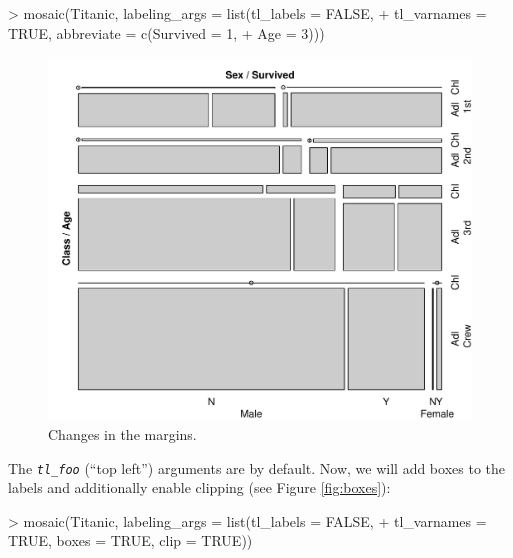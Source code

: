 \documentclass[a4paper]{article}
\newcommand{\var}[1]{\textit{\texttt{#1}}}
\begin{document}
\begin{Schunk}
\begin{Sinput}
> mosaic(Titanic, labeling_args = list(tl_labels = FALSE, 
+     tl_varnames = TRUE, abbreviate = c(Survived = 1, 
+         Age = 3)))
\end{Sinput}
\end{Schunk}

\begin{figure}[p]
\begin{center}
\includegraphics{labeling-marginsfig}
\caption{Changes in the margins.}
\label{fig:margins}
\end{center}
\end{figure}

\noindent The \var{tl\_foo} (``top left'') arguments are  by default. 
Now, we will add boxes to the labels and additionally
enable clipping (see Figure \ref{fig:boxes}):

\begin{Schunk}
\begin{Sinput}
> mosaic(Titanic, labeling_args = list(tl_labels = FALSE, 
+     tl_varnames = TRUE, boxes = TRUE, clip = TRUE))
\end{Sinput}
\end{Schunk}
\end{document}
